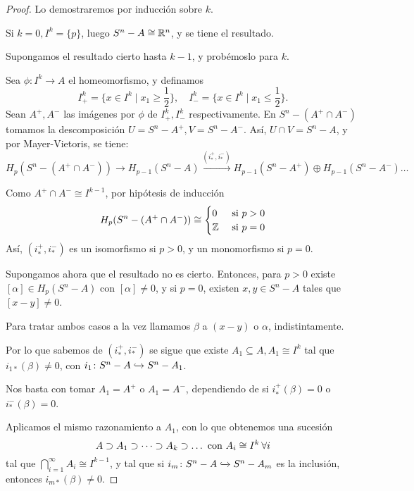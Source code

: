 \begin{proof}
  Lo demostraremos por inducción sobre $k$.

  Si $k = 0, I^k = \{p\}$, luego $S^n - A \cong \mathbb{R}^n$, y se tiene el resultado.

  Supongamos el resultado cierto hasta $k-1$, y probémoslo para $k$.

  Sea $\phi \colon I^k \to A$ el homeomorfismo, y definamos
  \[ I_+^k = \{x \in I^k \mid x_1 \geq \frac{1}{2}\}, \quad I_-^k = \{x \in I^k \mid x_1 \leq \frac{1}{2}\}.\]
  Sean $A^+, A^-$ las imágenes por $\phi$ de $I_+^k, I_-^k$ respectivamente.
  En $S^n - (A^+ \cap A^-)$ tomamos la descomposición $U = S^n - A^+, V = S^n - A^-$. Así,
  $U \cap V = S^n - A$, y por Mayer-Vietoris, se tiene:
  \[ H_p(S^n - (A^+ \cap A^-)) \to H_{p-1}(S^n - A) \xrightarrow{(i_*^+, i_*^-)} H_{p-1}(S^n - A^+) \oplus H_{p-1}(S^n - A^-) \dots \]

  Como $A^+ \cap A^- \cong I^{k-1}$, por hipótesis de inducción \\
  \[H_p(S^n - (A^+ \cap A^-)) \cong \begin{cases} 0 &\text{ si } p > 0 \\
                                                \mathbb{Z} &\text{ si } p = 0 \end{cases}\]
  Así, $(i_*^+, i_*^-)$ es un isomorfismo si $p > 0$, y un monomorfismo si $p = 0$.

  Supongamos ahora que el resultado no es cierto. Entonces, para $p > 0$ existe $[\alpha] \in H_p(S^n - A)$ con $[\alpha] \neq 0$, y
  si $p = 0$, existen $x, y \in S^n - A$ tales que $[x-y] \neq 0$.

  Para tratar ambos casos a la vez llamamos $\beta$ a $(x-y)$ o $\alpha$, indistintamente.

  Por lo que sabemos de $(i_*^+, i_*^-)$ se sigue que existe $A_1 \subseteq A, A_1 \cong I^k$ tal que
  $i_{1*}(\beta) \neq 0$, con $i_1 \colon S^n - A \xhookrightarrow{} S^n - A_1$.

  Nos basta con tomar $A_1 = A^+$ o $A_1 = A^-$, dependiendo de si $i_*^+(\beta) = 0$ o $i_*^-(\beta) = 0$.

  Aplicamos el mismo razonamiento a $A_1$, con lo que obtenemos una sucesión
  \[ A \supset A_1 \supset \dots \supset A_k \supset \dots \text{ con } A_i \cong I^k \hspace{0.2em} \forall i \]
  tal que $\bigcap\limits_{i = 1}^\infty A_i \cong I^{k-1}$, y tal que si $i_m \colon S^n - A \xhookrightarrow{} S^n - A_m$
  es la inclusión, entonces $i_{m*}(\beta) \neq 0$.


\end{proof}
